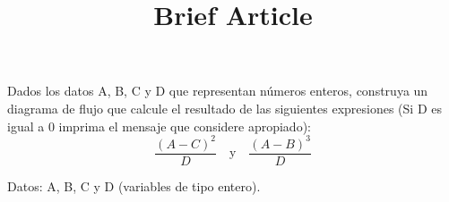 \documentclass[11pt]{amsart}
\title{Brief Article}
\begin{document}
\maketitle
Dados los datos A, B, C y D que representan números enteros, construya un diagrama de flujo que calcule el resultado de las siguientes expresiones (Si D es igual a 0 imprima el mensaje que considere apropiado): \\

\[
\frac{{(A - C)^2}}{{D}} \quad \text{y} \quad \frac{{(A - B)^3}}{{D}}
\]

Datos: A, B, C y D (variables de tipo entero).
\end{document}
